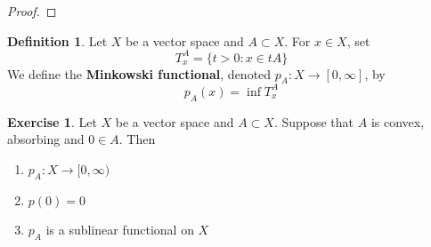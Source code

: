 \documentclass[12pt]{amsart}
\theoremstyle{definition}
\newtheorem{defn}[definition]{Definition}
\newtheorem{ex}[definition]{Exercise}
\newcommand{\RG}{[0,\infty]}
\newcommand{\Rg}{[0,\infty)}
\begin{document}
	\begin{proof}
		
	\end{proof}

	\begin{defn}
		Let $X$ be a vector space and $A \subset X$. For $x \in X$, set $$T^A_x = \{t > 0: x \in tA\}$$ We define the \textbf{Minkowski functional}, denoted $p_A: X \rightarrow \RG$, by $$p_A(x) = \inf T^A_x$$ 
	\end{defn}

	\begin{ex}
		Let $X$ be a vector space and $A \subset X$. Suppose that $A$ is convex, absorbing and $0 \in A$. Then 
		\begin{enumerate}
			\item $p_A:X \rightarrow \Rg$ 
			\item $p(0) = 0$
			\item $p_A$ is a sublinear functional on $X$
		\end{enumerate}
	\end{ex}
\end{document}
